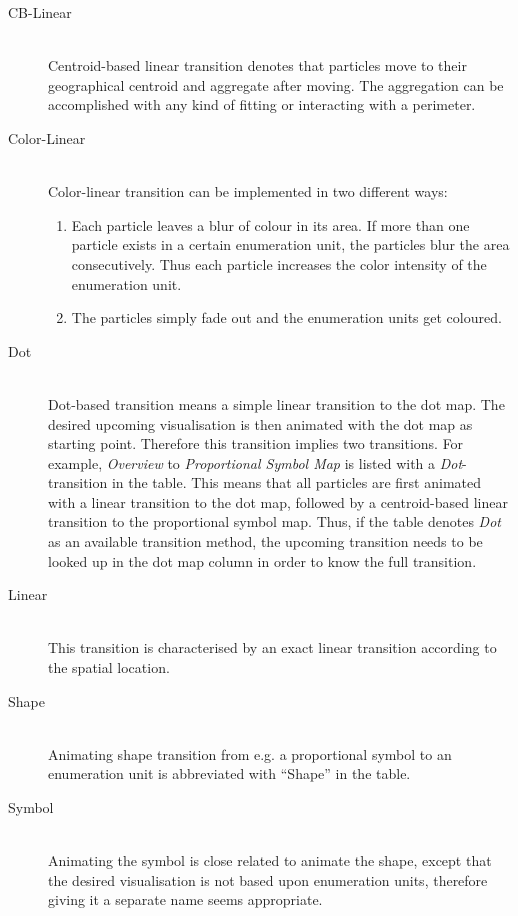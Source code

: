 \begin{description}

\item[CB-Linear] \hfill \\
Centroid-based linear transition denotes that particles move to their geographical centroid and aggregate after moving. The aggregation can be accomplished with any kind of fitting or interacting with a perimeter.

\item[Color-Linear] \hfill \\
Color-linear transition can be implemented in two different ways:

\begin{enumerate}
\item Each particle leaves a blur of colour in its area. If more than one particle exists in a certain enumeration unit, the particles blur the area consecutively. Thus each particle increases the color intensity of the enumeration unit.
\item The particles simply fade out and the enumeration units get coloured.
\end{enumerate}

\item[Dot] \hfill \\
Dot-based transition means a simple linear transition to the dot map. The desired upcoming visualisation is then animated with the dot map as starting point. Therefore this transition implies two transitions. For example, \textit{Overview} to \textit{Proportional Symbol Map} is listed with a \textit{Dot}-transition in the table. This means that all particles are first animated with a linear transition to the dot map, followed by a centroid-based linear transition to the proportional symbol map. Thus, if the table denotes \textit{Dot} as an available transition method, the upcoming transition needs to be looked up in the dot map column in order to know the full transition.

\item[Linear] \hfill \\
This transition is characterised by an exact linear transition according to the spatial location.

\item[Shape] \hfill \\
Animating shape transition from e.g. a proportional symbol to an enumeration unit is abbreviated with ``Shape'' in the table.

\item[Symbol] \hfill \\
Animating the symbol is close related to animate the shape, except that the desired visualisation is not based upon enumeration units, therefore giving it a separate name seems appropriate.

\end{description}

